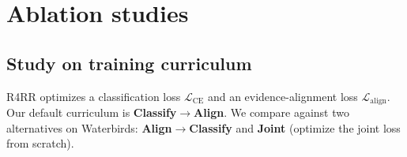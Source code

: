\section{Ablation studies}\label{sec:ablation}

\subsection{Study on training curriculum}\label{sec:ablationtrainingcuriculum}

R4RR optimizes a classification loss $\mathcal{L}_{\mathrm{CE}}$ and an evidence-alignment loss $\mathcal{L}_{\mathrm{align}}$. Our default curriculum is \textbf{Classify$\rightarrow$Align}. We compare against two alternatives on Waterbirds: \textbf{Align$\rightarrow$Classify} and \textbf{Joint} (optimize the joint loss from scratch).

